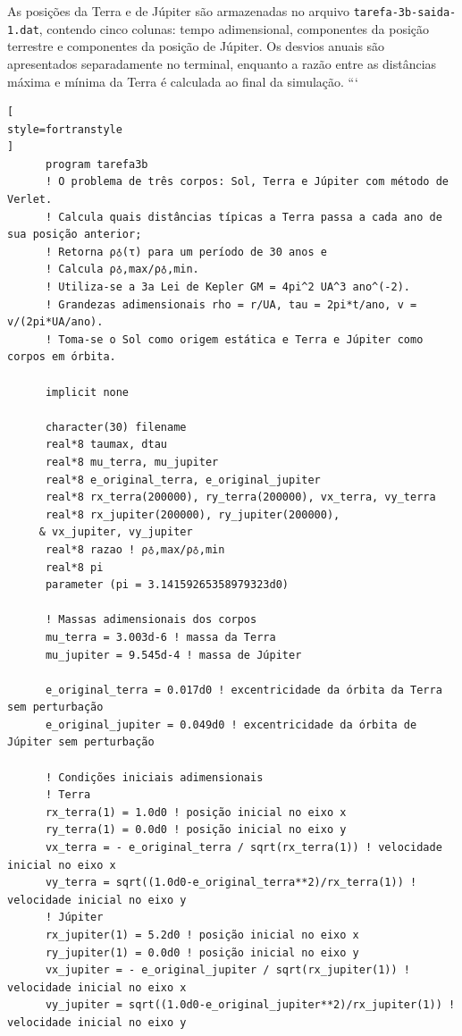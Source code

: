 \documentclass[12pt,a4paper]{article}
\begin{document}
As posições da Terra e de Júpiter são armazenadas no arquivo \texttt{tarefa-3b-saida-1.dat}, contendo cinco colunas: tempo adimensional, componentes da posição terrestre e componentes da posição de Júpiter. Os desvios anuais são apresentados separadamente no terminal, enquanto a razão entre as distâncias máxima e mínima da Terra é calculada ao final da simulação.
```

\begin{lstlisting}[
style=fortranstyle
]
      program tarefa3b
      ! O problema de três corpos: Sol, Terra e Júpiter com método de Verlet.
      ! Calcula quais distâncias típicas a Terra passa a cada ano de sua posição anterior; 
      ! Retorna ρ♁(τ) para um período de 30 anos e 
      ! Calcula ρ♁,max/ρ♁,min.
      ! Utiliza-se a 3a Lei de Kepler GM = 4pi^2 UA^3 ano^(-2).
      ! Grandezas adimensionais rho = r/UA, tau = 2pi*t/ano, v = v/(2pi*UA/ano).
      ! Toma-se o Sol como origem estática e Terra e Júpiter como corpos em órbita.

      implicit none

      character(30) filename
      real*8 taumax, dtau
      real*8 mu_terra, mu_jupiter
      real*8 e_original_terra, e_original_jupiter
      real*8 rx_terra(200000), ry_terra(200000), vx_terra, vy_terra
      real*8 rx_jupiter(200000), ry_jupiter(200000), 
     & vx_jupiter, vy_jupiter
      real*8 razao ! ρ♁,max/ρ♁,min
      real*8 pi
      parameter (pi = 3.14159265358979323d0)

      ! Massas adimensionais dos corpos
      mu_terra = 3.003d-6 ! massa da Terra
      mu_jupiter = 9.545d-4 ! massa de Júpiter

      e_original_terra = 0.017d0 ! excentricidade da órbita da Terra sem perturbação
      e_original_jupiter = 0.049d0 ! excentricidade da órbita de Júpiter sem perturbação

      ! Condições iniciais adimensionais
      ! Terra
      rx_terra(1) = 1.0d0 ! posição inicial no eixo x
      ry_terra(1) = 0.0d0 ! posição inicial no eixo y
      vx_terra = - e_original_terra / sqrt(rx_terra(1)) ! velocidade inicial no eixo x
      vy_terra = sqrt((1.0d0-e_original_terra**2)/rx_terra(1)) ! velocidade inicial no eixo y
      ! Júpiter
      rx_jupiter(1) = 5.2d0 ! posição inicial no eixo x
      ry_jupiter(1) = 0.0d0 ! posição inicial no eixo y
      vx_jupiter = - e_original_jupiter / sqrt(rx_jupiter(1)) ! velocidade inicial no eixo x
      vy_jupiter = sqrt((1.0d0-e_original_jupiter**2)/rx_jupiter(1)) ! velocidade inicial no eixo y


\end{lstlisting}
\end{document}
